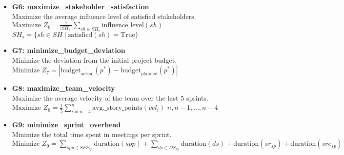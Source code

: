 \documentclass[11pt]{article}
\begin{document}
\begin{itemize}
    \item \textbf{G6: maximize\_stakeholder\_satisfaction} \\
          Maximize the average influence level of satisfied stakeholders. \\
          $\text{Maximize } Z_6 = \frac{1}{|SH_s|} \sum_{sh \in SH_s} \text{influence\_level}(sh)$ \quad {} $SH_s = \{sh \in SH \mid \text{satisfied}(sh) = \text{True}\}$

    \item \textbf{G7: minimize\_budget\_deviation} \\
          Minimize the deviation from the initial project budget. \\
          $\text{Minimize } Z_7 = | \text{budget}_{\text{actual}}(p^*) - \text{budget}_{\text{planned}}(p^*) |$

    \item \textbf{G8: maximize\_team\_velocity} \\
          Maximize the average velocity of the team over the last 5 sprints. \\
          $\text{Maximize } Z_8 = \frac{1}{5} \sum_{i=n-4}^{n} \text{avg.\_story\_points}(vel_i)$ \quad {} $n, n-1, ..., n-4$

    \item \textbf{G9: minimize\_sprint\_overhead} \\
          Minimize the total time spent in meetings per sprint. \\
          $\text{Minimize } Z_9 = \sum_{spp \in SPP_{sp}} \text{duration}(spp) + \sum_{ds \in DS_{sp}} \text{duration}(ds) + \text{duration}(sr_{sp}) + \text{duration}(sre_{sp})$
\end{itemize}
\end{document}
